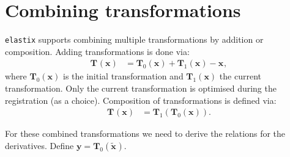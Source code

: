 \documentclass[]{article}
\newcommand{\vT}{\bm{T}}
\newcommand{\vTx}[1][]{\bm{T}_{#1}(\bm{x})}
\newcommand{\vx}[1][]{\bm{x}_{#1}}
\newcommand{\vxt}[1][]{\bm{\widetilde x}_{#1}}
\begin{document}
\section{Combining transformations}

\texttt{elastix} supports combining multiple transformations by
addition or composition. Adding transformations is done via:
\begin{align}
\vTx &= \vTx[0] + \vTx[1] - \vx,
\end{align}
where $\vTx[0]$ is the initial transformation and $\vTx[1]$ the
current transformation. Only the current transformation is optimised
during the registration (as a choice). Composition of
transformations is defined via:
\begin{align}
\vTx &= \vT_1(\vTx[0]).
\end{align}

For these combined transformations we need to derive the relations
for the derivatives. Define $\bm{y} = \vT_0(\vxt)$.
\end{document}
